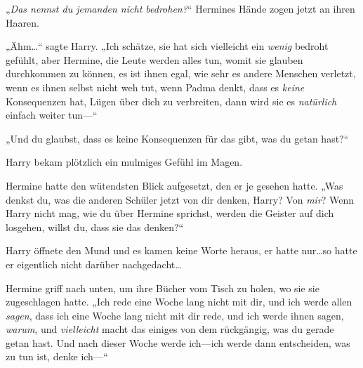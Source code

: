 „\emph{Das nennst du jemanden nicht bedrohen?}“ Hermines Hände zogen jetzt an ihren Haaren.

„Ähm…“ sagte Harry. „Ich schätze, sie hat sich vielleicht ein \emph{wenig} bedroht gefühlt, aber Hermine, die Leute werden alles tun, womit sie glauben durchkommen zu können, es ist ihnen egal, wie sehr es andere Menschen verletzt, wenn es ihnen selbst nicht weh tut, wenn Padma denkt, dass es \emph{keine} Konsequenzen hat, Lügen über dich zu verbreiten, dann wird sie es \emph{natürlich} einfach weiter tun—“

„Und du glaubst, dass es keine Konsequenzen für das gibt, was du getan hast?“

Harry bekam plötzlich ein mulmiges Gefühl im Magen.

Hermine hatte den wütendsten Blick aufgesetzt, den er je gesehen hatte. „Was denkst du, was die anderen Schüler jetzt von dir denken, Harry? Von \emph{mir}? Wenn Harry nicht mag, wie du über Hermine sprichst, werden die Geister auf dich losgehen, willst du, dass sie das denken?“

Harry öffnete den Mund und es kamen keine Worte heraus, er hatte nur…so hatte er eigentlich nicht darüber nachgedacht…

Hermine griff nach unten, um ihre Bücher vom Tisch zu holen, wo sie sie zugeschlagen hatte. „Ich rede eine Woche lang nicht mit dir, und ich werde allen \emph{sagen}, dass ich eine Woche lang nicht mit dir rede, und ich werde ihnen sagen, \emph{warum}, und \emph{vielleicht} macht das einiges von dem rückgängig, was du gerade getan hast. Und nach dieser Woche werde ich—ich werde dann entscheiden, was zu tun ist, denke ich—“

